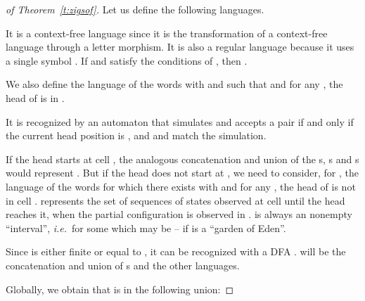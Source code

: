 \documentclass{llncs}
\newcommand{\ie}{\textit{i.e.}\ }
\begin{document}
\begin{proof}[of Theorem~\ref{t:zigsof}]
Let us define the following languages.




It is a context-free language since it is the transformation of a context-free language through a letter morphism.
It is also a regular language because it uses a single symbol .
If  and  satisfy the conditions of , then .

We also define the language  of the words  with  and  such that  and for any , the head of  is in .

It is recognized by an automaton that simulates  and accepts a pair  if and only if the current head position is , and  and  match the simulation.

If the head starts at cell , the analogous concatenation and union of the s, s and s would represent . But if the head does not start at , we need to consider, for , the language  of the words  for which there exists  with  and for any , the head of  is not in cell .
 represents the set of sequences of states observed at cell  until the head reaches it, when the partial configuration  is observed in .
 is always an nonempty ``interval'', \ie  for some  which may be  -- if  is a ``garden of Eden''.



Since  is either finite or equal to , it can be recognized with a DFA .
 will be the concatenation and union of s and the other languages.

Globally, we obtain that  is in the following union:

\end{proof}
\end{document}
